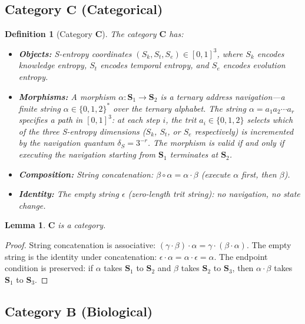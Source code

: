 \documentclass[twocolumn,10pt]{article}
\newtheorem{lemma}[theorem]{Lemma}
\newtheorem{definition}[theorem]{Definition}
\theoremstyle{remark}
\newcommand{\Sk}{S_k}
\newcommand{\St}{S_t}
\newcommand{\Se}{S_e}
\newcommand{\Scoord}{\mathbf{S}}
\newcommand{\CatC}{\mathbf{C}}
\newcommand{\CatB}{\mathbf{B}}
\begin{document}
\subsection{Category $\CatC$ (Categorical)}

\begin{definition}[Category $\CatC$]
\label{def:catC}
The category $\CatC$ has:
\begin{itemize}
    \item \textbf{Objects:} S-entropy coordinates $(\Sk, \St, \Se) \in [0,1]^3$, where $\Sk$ encodes knowledge entropy, $\St$ encodes temporal entropy, and $\Se$ encodes evolution entropy.

    \item \textbf{Morphisms:} A morphism $\alpha: \Scoord_1 \to \Scoord_2$ is a ternary address navigation---a finite string $\alpha \in \{0,1,2\}^*$ over the ternary alphabet.
    The string $\alpha = a_1 a_2 \cdots a_r$ specifies a path in $[0,1]^3$: at each step $i$, the trit $a_i \in \{0,1,2\}$ selects which of the three S-entropy dimensions ($\Sk$, $\St$, or $\Se$ respectively) is incremented by the navigation quantum $\delta_S = 3^{-r}$.
    The morphism is valid if and only if executing the navigation starting from $\Scoord_1$ terminates at $\Scoord_2$.

    \item \textbf{Composition:} String concatenation: $\beta \circ \alpha = \alpha \cdot \beta$ (execute $\alpha$ first, then $\beta$).

    \item \textbf{Identity:} The empty string $\epsilon$ (zero-length trit string): no navigation, no state change.
\end{itemize}
\end{definition}

\begin{lemma}
$\CatC$ is a category.
\end{lemma}
\begin{proof}
String concatenation is associative: $(\gamma \cdot \beta) \cdot \alpha = \gamma \cdot (\beta \cdot \alpha)$.
The empty string is the identity under concatenation: $\epsilon \cdot \alpha = \alpha \cdot \epsilon = \alpha$.
The endpoint condition is preserved: if $\alpha$ takes $\Scoord_1$ to $\Scoord_2$ and $\beta$ takes $\Scoord_2$ to $\Scoord_3$, then $\alpha \cdot \beta$ takes $\Scoord_1$ to $\Scoord_3$.
\end{proof}

\subsection{Category $\CatB$ (Biological)}
\end{document}
